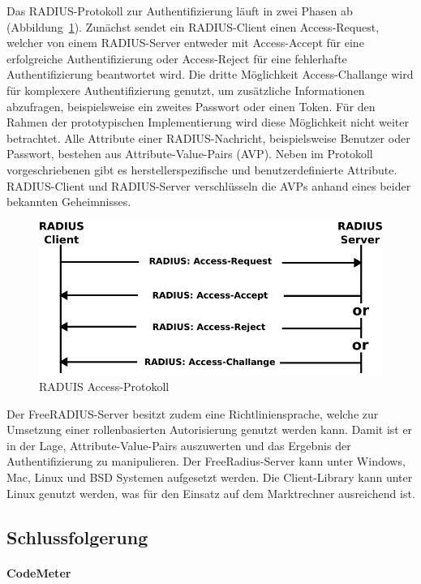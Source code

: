 \documentclass[11pt,a4paper]{report}
\begin{document}
Das RADIUS-Protokoll zur Authentifizierung läuft in zwei Phasen ab (Abbildung~\ref{fig:radius_access}). Zunächst sendet ein RADIUS-Client einen Access-Request, welcher von einem RADIUS-Server entweder mit Access-Accept für eine erfolgreiche Authentifizierung oder Access-Reject für eine fehlerhafte Authentifizierung beantwortet wird. Die dritte Möglichkeit Access-Challange wird für komplexere Authentifizierung genutzt, um zusätzliche Informationen abzufragen, beispielsweise ein zweites Passwort oder einen Token. Für den Rahmen der prototypischen Implementierung wird diese Möglichkeit nicht weiter betrachtet. Alle Attribute einer RADIUS-Nachricht, beispielsweise Benutzer oder Passwort, bestehen aus Attribute-Value-Pairs (AVP). Neben im Protokoll vorgeschriebenen gibt es herstellerspezifische und benutzerdefinierte Attribute. RADIUS-Client und RADIUS-Server verschlüsseln die AVPs anhand eines beider bekannten Geheimnisses.

\begin{figure}[htbp]
\centering
\includegraphics[scale=0.8]{images/RADIUS_access.pdf}
\caption{RADUIS Access-Protokoll}
\label{fig:radius_access}
\end{figure}

Der FreeRADIUS-Server besitzt zudem eine Richtliniensprache, welche zur Umsetzung einer rollenbasierten Autorisierung genutzt werden kann. Damit ist er in der Lage, Attribute-Value-Pairs auszuwerten und das Ergebnis der Authentifizierung zu manipulieren. Der FreeRadius-Server kann unter Windows, Mac, Linux und BSD Systemen aufgesetzt werden. Die Client-Library kann unter Linux genutzt werden, was für den Einsatz auf dem Marktrechner ausreichend ist.

\subsection{Schlussfolgerung}

\paragraph{CodeMeter}
\end{document}
